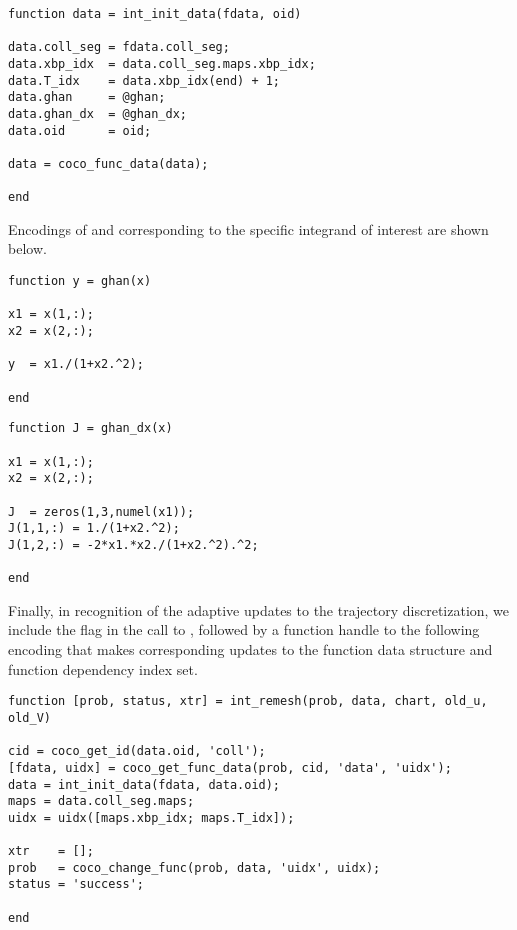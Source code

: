 \begin{lstlisting}[language=coco-highlight]
function data = int_init_data(fdata, oid)

data.coll_seg = fdata.coll_seg;
data.xbp_idx  = data.coll_seg.maps.xbp_idx;
data.T_idx    = data.xbp_idx(end) + 1;
data.ghan     = @ghan;
data.ghan_dx  = @ghan_dx;
data.oid      = oid;

data = coco_func_data(data);

end
\end{lstlisting}
Encodings of  and  corresponding to the specific integrand of interest are shown below.
\begin{lstlisting}[language=coco-highlight]
function y = ghan(x)

x1 = x(1,:);
x2 = x(2,:);

y  = x1./(1+x2.^2);

end
\end{lstlisting}
\begin{lstlisting}[language=coco-highlight]
function J = ghan_dx(x)

x1 = x(1,:);
x2 = x(2,:);

J  = zeros(1,3,numel(x1));
J(1,1,:) = 1./(1+x2.^2);
J(1,2,:) = -2*x1.*x2./(1+x2.^2).^2;

end
\end{lstlisting}

Finally, in recognition of the adaptive updates to the trajectory discretization, we include the  flag in the call to , followed by a function handle to the following encoding that makes corresponding updates to the  function data structure and function dependency index set.
\begin{lstlisting}[language=coco-highlight]
function [prob, status, xtr] = int_remesh(prob, data, chart, old_u, old_V)

cid = coco_get_id(data.oid, 'coll');
[fdata, uidx] = coco_get_func_data(prob, cid, 'data', 'uidx');
data = int_init_data(fdata, data.oid);
maps = data.coll_seg.maps;
uidx = uidx([maps.xbp_idx; maps.T_idx]);

xtr    = [];
prob   = coco_change_func(prob, data, 'uidx', uidx);
status = 'success';

end
\end{lstlisting}


